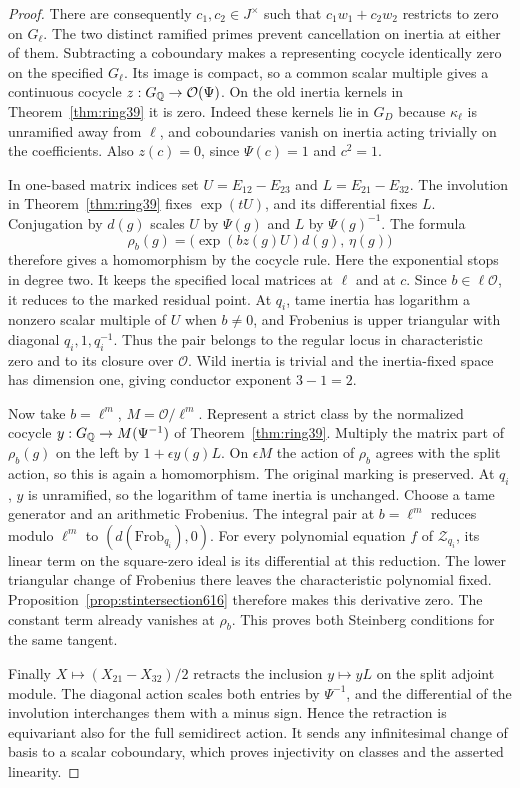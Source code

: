 \documentclass[a4paper,11pt]{article}
\theoremstyle{definition}
\theoremstyle{remark}
\numberwithin{equation}{section}
\newcommand{\OO}{\mathcal O}
\begin{document}
\begin{proof}
There are consequently \(c_1,c_2\in J^\times\) such that
\(c_1w_1+c_2w_2\) restricts to zero on \(G_\ell\). The two distinct
ramified primes prevent cancellation on inertia at either of them.
Subtracting a coboundary makes a representing cocycle identically
zero on the specified \(G_\ell\). Its image is compact, so a common
scalar multiple gives a continuous cocycle
\(z:G_\QQ\to\OO(\Psi)\). On the old inertia kernels in
Theorem~\ref{thm:ring39} it is zero. Indeed these kernels lie in
\(G_D\) because \(\kappa_\ell\) is unramified away from \(\ell\),
and coboundaries vanish on inertia acting trivially on the
coefficients. Also \(z(c)=0\), since \(\Psi(c)=1\) and \(c^2=1\).

In one-based matrix indices set
\(U=E_{12}-E_{23}\) and \(L=E_{21}-E_{32}\).
The involution in Theorem~\ref{thm:ring39} fixes \(\exp(tU)\), and
its differential fixes \(L\). Conjugation by \(d(g)\) scales \(U\)
by \(\Psi(g)\) and \(L\) by \(\Psi(g)^{-1}\). The formula
\[
       \rho_b(g)=\big(\exp(bz(g)U)d(g),\,\eta(g)\big)
\]
therefore gives a homomorphism by the cocycle rule. Here the
exponential stops in degree two. It keeps the specified local
matrices at \(\ell\) and at \(c\). Since \(b\in\ell\OO\), it reduces
to the marked residual point. At \(q_i\), tame inertia has logarithm
a nonzero scalar multiple of \(U\) when \(b\ne0\), and Frobenius is
upper triangular with diagonal \(q_i,1,q_i^{-1}\). Thus the pair
belongs to the regular locus in characteristic zero and to its
closure over \(\OO\). Wild inertia is trivial and the inertia-fixed
space has dimension one, giving conductor exponent \(3-1=2\).

Now take \(b=\ell^m\), \(M=\OO/\ell^m\). Represent a strict class by
the normalized cocycle \(y:G_\mathbb Q\to M(\Psi^{-1})\) of
Theorem~\ref{thm:ring39}. Multiply the matrix part of \(\rho_b(g)\)
on the left by \(1+\epsilon y(g)L\). On \(\epsilon M\) the action
of \(\rho_b\) agrees with the split action, so this is again a
homomorphism. The original marking is preserved. At \(q_i\), \(y\)
is unramified, so the logarithm of tame inertia is unchanged. Choose
a tame generator and an arithmetic Frobenius. The integral pair at
\(b=\ell^m\) reduces modulo \(\ell^m\) to \((d(\mathrm{Frob}_{q_i}),0)\).
For every polynomial equation \(f\) of \(\mathcal Z_{q_i}\), its
linear term on the square-zero ideal is its differential at this
reduction. The lower triangular change of Frobenius there leaves the
characteristic polynomial fixed. Proposition~\ref{prop:stintersection616}
therefore makes this derivative zero. The constant term already
vanishes at \(\rho_b\). This proves both Steinberg conditions for the
same tangent.

Finally \(X\mapsto(X_{21}-X_{32})/2\) retracts the inclusion
\(y\mapsto yL\) on the split adjoint module. The diagonal action
scales both entries by \(\Psi^{-1}\), and the differential of the
involution interchanges them with a minus sign. Hence the retraction
is equivariant also for the full semidirect action. It sends any
infinitesimal change of basis to a scalar coboundary, which proves
injectivity on classes and the asserted linearity.
\end{proof}
\end{document}
